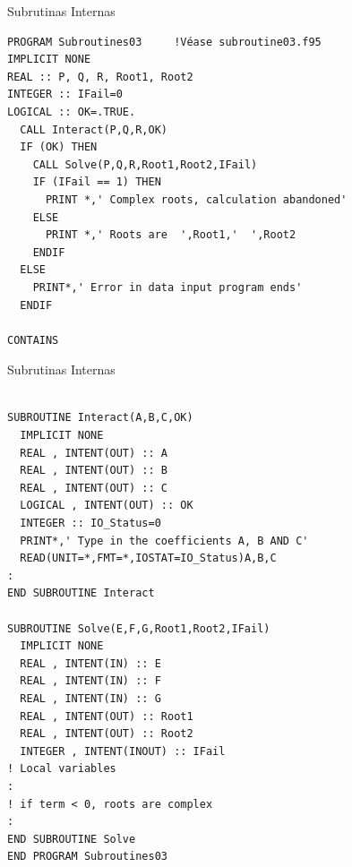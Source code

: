 \begin{frame}[fragile]{Subrutinas Internas}
 \begin{itemize}[<+(0)->]
      \begin{verbatim}
PROGRAM Subroutines03     !Véase subroutine03.f95
IMPLICIT NONE
REAL :: P, Q, R, Root1, Root2
INTEGER :: IFail=0
LOGICAL :: OK=.TRUE.
  CALL Interact(P,Q,R,OK)
  IF (OK) THEN
    CALL Solve(P,Q,R,Root1,Root2,IFail)
    IF (IFail == 1) THEN
      PRINT *,' Complex roots, calculation abandoned'
    ELSE
      PRINT *,' Roots are  ',Root1,'  ',Root2
    ENDIF
  ELSE
    PRINT*,' Error in data input program ends'
  ENDIF

CONTAINS 
      \end{verbatim}
 \end{itemize}
\end{frame}

\begin{frame}[fragile]{Subrutinas Internas}
 \begin{itemize}[<+(0)->]
    \begin{verbatim}

SUBROUTINE Interact(A,B,C,OK)
  IMPLICIT NONE
  REAL , INTENT(OUT) :: A
  REAL , INTENT(OUT) :: B
  REAL , INTENT(OUT) :: C
  LOGICAL , INTENT(OUT) :: OK
  INTEGER :: IO_Status=0
  PRINT*,' Type in the coefficients A, B AND C'
  READ(UNIT=*,FMT=*,IOSTAT=IO_Status)A,B,C
:
END SUBROUTINE Interact

SUBROUTINE Solve(E,F,G,Root1,Root2,IFail)
  IMPLICIT NONE
  REAL , INTENT(IN) :: E
  REAL , INTENT(IN) :: F
  REAL , INTENT(IN) :: G
  REAL , INTENT(OUT) :: Root1
  REAL , INTENT(OUT) :: Root2
  INTEGER , INTENT(INOUT) :: IFail
! Local variables
:
! if term < 0, roots are complex
:
END SUBROUTINE Solve
END PROGRAM Subroutines03
    \end{verbatim}
 \end{itemize}
\end{frame}